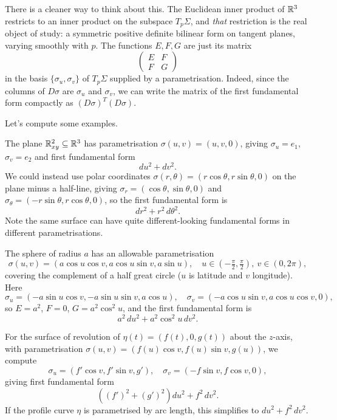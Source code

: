 \documentclass[a4paper]{scrartcl}
\begin{document}
\begin{remark}
    There is a cleaner way to think about this. The Euclidean inner product of $\mathbb{R}^3$ restricts to an inner product on the subspace $T_p \Sigma$, and \emph{that} restriction is the real object of study: a symmetric positive definite bilinear form on tangent planes, varying smoothly with $p$. The functions $E, F, G$ are just its matrix
    $$
    \begin{pmatrix} E & F \\ F & G \end{pmatrix}
    $$
    in the basis $\{\sigma_u, \sigma_v\}$ of $T_p\Sigma$ supplied by a parametrisation. Indeed, since the columns of $D\sigma$ are $\sigma_u$ and $\sigma_v$, we can write the matrix of the first fundamental form compactly as $(D\sigma)^T (D\sigma)$.
\end{remark}

Let's compute some examples.

\begin{example}
    The plane $\mathbb{R}^2_{xy} \subseteq \mathbb{R}^3$ has parametrisation $\sigma(u, v) = (u, v, 0)$, giving $\sigma_u = e_1$, $\sigma_v = e_2$ and first fundamental form
    $$
    du^2 + dv^2.
    $$
    We could instead use polar coordinates $\sigma(r, \theta) = (r\cos\theta, r\sin\theta, 0)$ on the plane minus a half-line, giving $\sigma_r = (\cos\theta, \sin\theta, 0)$ and $\sigma_\theta = (-r\sin\theta, r\cos\theta, 0)$, so the first fundamental form is
    $$
    dr^2 + r^2 \, d\theta^2.
    $$
    Note the same surface can have quite different-looking fundamental forms in different parametrisations.
\end{example}

\begin{example}\label{ex:sphereFFF}
    The sphere of radius $a$ has an allowable parametrisation
    $$
    \sigma(u, v) = (a \cos u \cos v, a \cos u \sin v, a \sin u), \quad u \in \left(-\tfrac{\pi}{2}, \tfrac{\pi}{2}\right),\ v \in (0, 2\pi),
    $$
    covering the complement of a half great circle ($u$ is latitude and $v$ longitude). Here
    $$
    \sigma_u = (-a\sin u \cos v, -a \sin u \sin v, a \cos u), \quad \sigma_v = (-a \cos u \sin v, a \cos u \cos v, 0),
    $$
    so $E = a^2$, $F = 0$, $G = a^2 \cos^2 u$, and the first fundamental form is
    $$
    a^2 \, du^2 + a^2 \cos^2 u \, dv^2.
    $$
\end{example}

\begin{example}\label{ex:revolutionFFF}
    For the surface of revolution of $\eta(t) = (f(t), 0, g(t))$ about the $z$-axis, with parametrisation $\sigma(u, v) = (f(u)\cos v, f(u) \sin v, g(u))$, we compute
    $$
    \sigma_u = (f'\cos v, f' \sin v, g'), \quad \sigma_v = (-f \sin v, f\cos v, 0),
    $$
    giving first fundamental form
    $$
    \left((f')^2 + (g')^2\right) du^2 + f^2 \, dv^2.
    $$
    If the profile curve $\eta$ is parametrised by arc length, this simplifies to $du^2 + f^2\,dv^2$.
\end{example}
\end{document}
